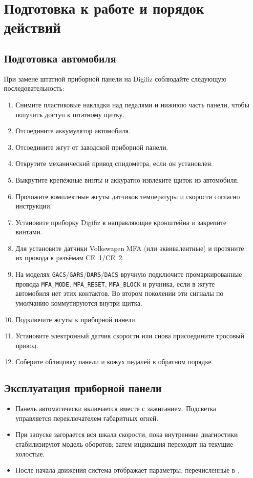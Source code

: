 \chapter{Подготовка к работе и порядок действий}\label{ch:preparation-ru}

\section{Подготовка автомобиля}
При замене штатной приборной панели на Digifiz соблюдайте следующую последовательность:
\begin{enumerate}
    \item Снимите пластиковые накладки над педалями и нижнюю часть панели, чтобы получить доступ к штатному щитку.
    \item Отсоедините аккумулятор автомобиля.
    \item Отсоедините жгут от заводской приборной панели.
    \item Открутите механический привод спидометра, если он установлен.
    \item Выкрутите крепёжные винты и аккуратно извлеките щиток из автомобиля.
    \item Проложите комплектные жгуты датчиков температуры и скорости согласно инструкции.
    \item Установите приборку Digifiz в направляющие кронштейна и закрепите винтами.
    \item Для \ReplicaNextLong{} установите датчики Volkswagen MFA (или эквивалентные) и протяните их провода к разъёмам CE~1/CE~2.
    \item На моделях \texttt{GACS}/\texttt{GARS}/\texttt{DARS}/\texttt{DACS} вручную подключите промаркированные провода \texttt{MFA\_MODE}, \texttt{MFA\_RESET}, \texttt{MFA\_BLOCK} и ручника, если в жгуте автомобиля нет этих контактов. Во втором поколении \ReplicaNextShort{} эти сигналы по умолчанию коммутируются внутри щитка.
    \item Подключите жгуты к приборной панели.
    \item Установите электронный датчик скорости или снова присоедините тросовый привод.
    \item Соберите облицовку панели и кожух педалей в обратном порядке.
\end{enumerate}

\section{Эксплуатация приборной панели}
\begin{itemize}
    \item Панель автоматически включается вместе с зажиганием. Подсветка управляется переключателем габаритных огней.
    \item При запуске загорается вся шкала скорости, пока внутренние диагностики стабилизируют модель оборотов; затем индикация переходит на текущие холостые.
    \item После начала движения система отображает параметры, перечисленные в .
\end{itemize}

